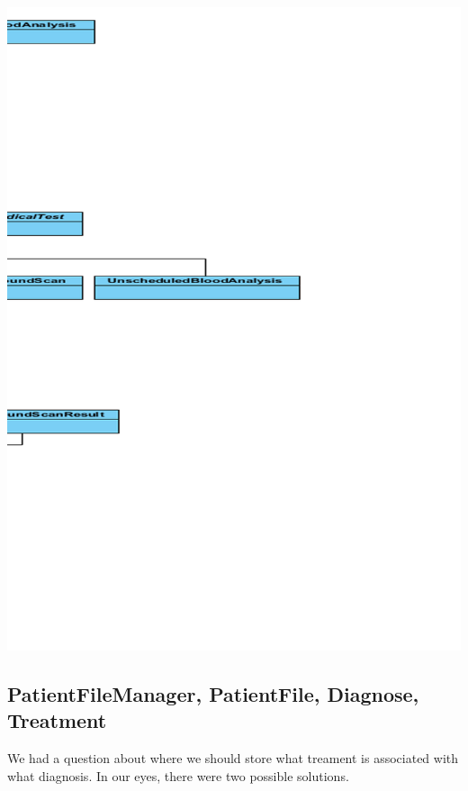 \documentclass[11pt]{article}
\begin{document}
\includegraphics[width=170mm]{right.png}\\

\subsection{PatientFileManager, PatientFile, Diagnose, Treatment}
We had a question about where we should store what treament is associated with what diagnosis. In our eyes, there were two possible solutions.
\end{document}
